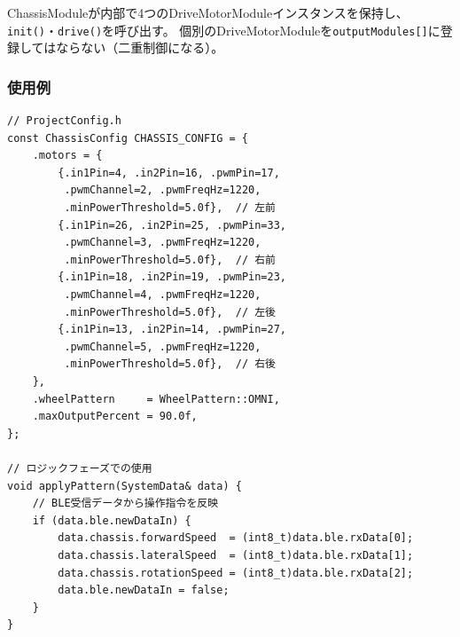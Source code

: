 \begin{cautionbox}[DriveMotorModuleの管理]
ChassisModuleが内部で4つのDriveMotorModuleインスタンスを保持し、\texttt{init()}・\texttt{drive()}を呼び出す。
個別のDriveMotorModuleを\texttt{outputModules[]}に登録してはならない（二重制御になる）。
\end{cautionbox}

\subsubsection{使用例}

\begin{lstlisting}[style=cppstyle, caption={ChassisModuleの使用例}]
// ProjectConfig.h
const ChassisConfig CHASSIS_CONFIG = {
    .motors = {
        {.in1Pin=4, .in2Pin=16, .pwmPin=17,
         .pwmChannel=2, .pwmFreqHz=1220,
         .minPowerThreshold=5.0f},  // 左前
        {.in1Pin=26, .in2Pin=25, .pwmPin=33,
         .pwmChannel=3, .pwmFreqHz=1220,
         .minPowerThreshold=5.0f},  // 右前
        {.in1Pin=18, .in2Pin=19, .pwmPin=23,
         .pwmChannel=4, .pwmFreqHz=1220,
         .minPowerThreshold=5.0f},  // 左後
        {.in1Pin=13, .in2Pin=14, .pwmPin=27,
         .pwmChannel=5, .pwmFreqHz=1220,
         .minPowerThreshold=5.0f},  // 右後
    },
    .wheelPattern     = WheelPattern::OMNI,
    .maxOutputPercent = 90.0f,
};

// ロジックフェーズでの使用
void applyPattern(SystemData& data) {
    // BLE受信データから操作指令を反映
    if (data.ble.newDataIn) {
        data.chassis.forwardSpeed  = (int8_t)data.ble.rxData[0];
        data.chassis.lateralSpeed  = (int8_t)data.ble.rxData[1];
        data.chassis.rotationSpeed = (int8_t)data.ble.rxData[2];
        data.ble.newDataIn = false;
    }
}
\end{lstlisting}
